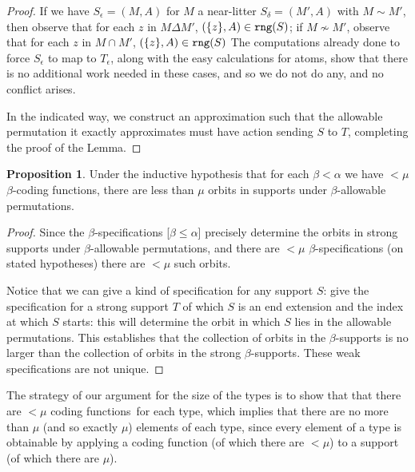 \documentclass[112pt]{article}
\theoremstyle{definition}
\newtheorem{proposition}[theorem]{Proposition}
\theoremstyle{remark}
\newcommand{\rk}[1]{{\color{blue}\sl #1}}
\newcommand{\suggest}[1]{{\color{red} #1}}
\begin{document}
\begin{proof}
If we have $S_\epsilon=(M,A)$ for $M$ a near-litter
$S_\delta = (M',A)$ with $M \sim M'$, then observe that for each $z$ in $M \Delta M'$,
$(\{z\},A) \in {{\tt rng}}(S)$;  if $M \nsim M'$, observe that for each $z$ in $M \cap M'$,
$(\{z\},A) \in {{\tt rng}}(S)$ The computations already done to force $S_\epsilon$ to map to $T_\epsilon$, along with the easy calculations for atoms, show that there is no additional work needed in these cases, and so we do not do any, and no conflict arises. %

In the indicated way, we construct an approximation such that the allowable permutation it exactly approximates must have action sending $S$ to $T$, completing the proof of the Lemma.
\end{proof}

\begin{proposition}\label{prop:count_support_orbits}
{Under the inductive hypothesis that for each $\beta<\alpha$ we have $<\mu$ $\beta$-coding functions, there are less than $\mu$ orbits in supports under $\beta$-allowable permutations.}
\end{proposition}
\begin{proof}
Since the $\beta$-specifications [$\beta \leq \alpha$] precisely determine the orbits in \suggest{strong} supports under $\beta$-allowable permutations, and there are $<\mu$ $\beta$-specifications
(on stated hypotheses) there are $<\mu$ such orbits.

Notice that we can give a kind of specification for any support $S$:  give the specification for a strong support $T$ of which $S$ is an end extension and the index at which $S$ starts:  this will determine the orbit in which $S$ lies in the allowable permutations.
This establishes that the collection of orbits in the $\beta$-supports is no larger than the collection of orbits in the strong $\beta$-supports.  These weak specifications are not unique. %
\end{proof}

The strategy of our argument for the size of the types is to show that that there are $<\mu$ coding functions\ for each type, which implies that there are no more than $\mu$ (and so exactly $\mu$) elements of each type, since every element of a type is obtainable by applying a coding function (of which there are $<\mu$) to a support (of which there are $\mu$).
\end{document}
